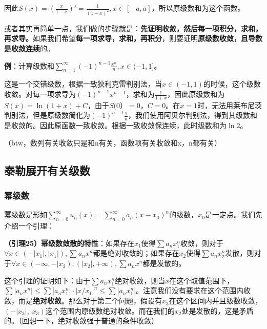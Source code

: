 \documentclass{ctexart}
\let\oldtextbf\textbf
\renewcommand{\textbf}[1]{\textcolor{brown!50!red}{\oldtextbf{#1}}}
\begin{document}
因此$S(x)=(\frac{x}{1-x})'=\frac{1}{(1-x)^2},x\in[-a,a]$，所以原级数和为这个函数。

或者其实再简单一点，我们做的步骤就是：\textbf{\color{brown!50!red}先证明收敛，然后}\textbf{\color{brown!50!red}每一项积分，求和，再求导。}如果我们希望\textbf{\color{brown!50!red}每一项求导，求和，再积分}，则要证明\textbf{\color{brown!50!red}原级数收敛，且导数是收敛连续}的。

\textbf{\color{brown!50!red}例}：计算级数和$\sum_{n=1}^\infty (-1)^{n-1}\frac{x^n}{n},x\in(-1,1]$。

这是一个交错级数，根据一致狄利克雷判别法，当$x\in(-1,1)$的时候，这个级数收敛。对每一项求导为$(-1)^{n-1}x^{n-1}$，求和为$\frac{1}{1+x}$，因此原级数和为$S(x)=\ln(1+x)+C$，由于$S(0）=0，C=0$。在$x=1$时，无法用莱布尼茨判别法，但是原级数简化为$(-1)^{n-1}\frac{1}{n}$，我们使用阿贝尔判别法，得到其级数和是收敛的。因此原函数一致收敛。根据一致收敛保连续，此时级数和为$\ln 2$。

（btw，数列有关收敛只是和n有关，函数项有关收敛和x，n都有关）

\subsection{泰勒展开有关级数}
\subsubsection{幂级数}
幂级数是形如$\sum_{n=0}^\infty u_n(x)=\sum_{n=0}^\infty a_n(x-x_0)^n$的级数，$x_0$是一定点。我们先介绍一个引理：

\begin{tcolorbox}[
    colback=bac2,     %
    colframe=fra2,   %
    coltitle=white,             %
    coltext=tex2,
    title=圆角框,
    fonttitle=\bfseries,        %
arc=3mm,                     %
breakable
]
\textbf{\color{brown!50!red}（引理25）幂级数敛散的特性}：如果存在$x_1$使得$\sum a_nx_1^n$收敛，则对于$\forall x\in(-|x_1|,|x_1|),\sum a_nx^n$都是绝对收敛的；如果存在$x_2$使得$\sum a_nx_2^n$发散，则对于$\forall x\in(-\infty ,-|x_2);(|x_2|,+\infty),\sum a_nx^n$都是发散的。
\end{tcolorbox}

这个引理的证明如下：由于$\sum a_n x_1^n$绝对收敛，则当$x$在这个取值范围下，$\sum |a_nx^n|\leq \sum|a_n x_1^n|\cdot|x/x_1|^n\leq \sum |a_n x_1^n|$。注意我们没有要求在这个范围内收敛，而是\textbf{\color{brown!50!red}绝对收敛}。那么对于第二个问题，假设有$x_3$在这个区间内并且级数收敛，$(-|x_3|,|x_3)$这个范围内原级数绝对收敛。而在我们的$x_2$处是发散的，这是矛盾的。（回想一下，绝对收敛强于普通的条件收敛）
\end{document}
